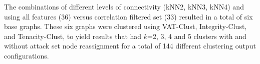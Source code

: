 \documentclass{bmcart}
\begin{document}
The combinations of different levels of connectivity (kNN2, kNN3, kNN4) and using all features (36) versus correlation filtered set (33) resulted in a total of six base graphs.  These six graphs were clustered using VAT-Clust, Integrity-Clust, and Tenacity-Clust, to yield results that had $k$=2, 3, 4 and 5 clusters with and without attack set node reassignment for a total of 144 different clustering output configurations. 




\end{document}
